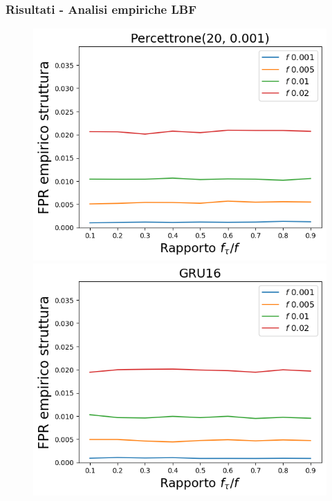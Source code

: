 \documentclass{beamer}
\begin{document}
\begin{frame}
\frametitle{Risultati - Analisi empiriche LBF}
\begin{figure}[htbp]
    \centering
    \begin{minipage}{0.25\textwidth}
    \centering
    \includegraphics[width=\textwidth]{immagini/7/LBF/Percettrone(20, 0.001)_FPR.png}
    \end{minipage}%
    \hfill
    \begin{minipage}{0.25\textwidth}
    \centering
    \includegraphics[width=\textwidth]{immagini/7/LBF/GRU16_FPR.png}
    \end{minipage}%

\end{figure}
\end{frame}
\end{document}
